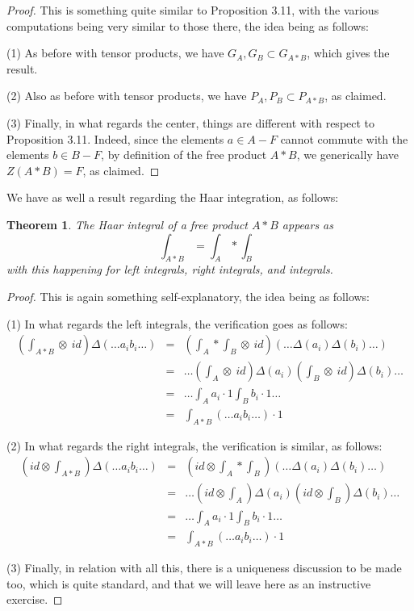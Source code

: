 \documentclass[12pt]{amsbook}
\newtheorem{theorem}{Theorem}[chapter]
\begin{document}
\begin{proof}
This is something quite similar to Proposition 3.11, with the various computations being very similar to those there, the idea being as follows:

\medskip

(1) As before with tensor products, we have $G_A,G_B\subset G_{A*B}$, which gives the result.

\medskip

(2) Also as before with tensor products, we have $P_A,P_B\subset P_{A*B}$, as claimed.

\medskip

(3) Finally, in what regards the center, things are different with respect to Proposition 3.11. Indeed, since the elements $a\in A-F$ cannot commute with the elements $b\in B-F$, by definition of the free product $A*B$, we generically have $Z(A*B)=F$, as claimed.
\end{proof}

We have as well a result regarding the Haar integration, as follows:

\begin{theorem}
The Haar integral of a free product $A*B$ appears as
$$\int_{A*B}=\int_A*\int_B$$
with this happening for left integrals, right integrals, and integrals.
\end{theorem}

\begin{proof}
This is again something self-explanatory, the idea being as follows:

\medskip

(1) In what regards the left integrals, the verification goes as follows:
\begin{eqnarray*}
\left(\int_{A*B}\otimes\  id\right)\Delta(\ldots a_ib_i\ldots)
&=&\left(\int_A*\int_B\otimes\ id\right)(\ldots\Delta(a_i)\Delta(b_i)\ldots)\\
&=&\ldots\left(\int_A\otimes\ id\right)\Delta(a_i)\left(\int_B\otimes\ id\right)\Delta(b_i)\ldots\\
&=&\ldots\int_Aa_i\cdot 1\int_Bb_i\cdot1\ldots\\
&=&\int_{A*B}(\ldots a_ib_i\ldots)\cdot 1
\end{eqnarray*}

(2) In what regards the right integrals, the verification is similar, as follows:
\begin{eqnarray*}
\left(id\otimes\int_{A*B}\right)\Delta(\ldots a_ib_i\ldots)
&=&\left(id\otimes\int_A*\int_B\right)(\ldots\Delta(a_i)\Delta(b_i)\ldots)\\
&=&\ldots\left(id\otimes\int_A\right)\Delta(a_i)\left(id\otimes\int_B\right)\Delta(b_i)\ldots\\
&=&\ldots\int_Aa_i\cdot 1\int_Bb_i\cdot1\ldots\\
&=&\int_{A*B}(\ldots a_ib_i\ldots)\cdot 1
\end{eqnarray*}

(3) Finally, in relation with all this, there is a uniqueness discussion to be made too, which is quite standard, and that we will leave here as an instructive exercise.
\end{proof}
\end{document}
